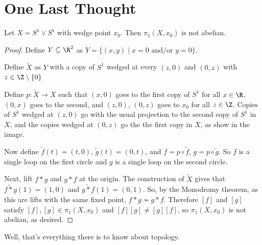 \section{One Last Thought}
\begin{example}
Let $X = S^1 \vee S^1$ with wedge point $x_0$.  Then $\pi_1(X, x_0)$ is not abelian.
\end{example}
\begin{proof}
Define $Y \subseteq \R^2$ as $Y = \{ (x,y) \mid x = 0 \text{ and/or } y = 0\}$.

Define $\widetilde{X}$ as $Y$ with a copy of $S^1$ wedged at every $(z,0)$ and $(0,z)$ with $z \in \Z \setminus \{0\}$

Define $p : \widetilde{X} \to X$ such that $(x,0)$ goes to the first copy of $S^1$ for all $x \in \R$, $(0,x)$ goes to the second, and $(z,0)$, $(0,z)$ goes to $x_0$ for all $z \in \Z$.  Copies of $S^1$ wedged at $(z,0)$ go with the usual projection to the second copy of $S^1$ in $X$, and the copies wedged at $(0,z)$ go the the first copy in $X$, as show in the image.
\placeholder

Now define $\widetilde{f}(t) = (t,0)$, $\widetilde{g}(t) = (0,t)$, and $f = p \circ \widetilde{f}$, $g = p \circ \widetilde{g}$.  So $f$ is a single loop on the first circle and $g$ is a single loop on the second circle.

Next, lift $f * g$ and $g * f$ at the origin.  The construction of $\widetilde{X}$ gives that $\widetilde{f * g}(1) = (1,0)$ and $\widetilde{g * f}(1) = (0,1)$.  So, by the Monodromy theorem, as this are lifts with the same fixed point, $f * g \not \sim g * f$.  Therefore $[f]$ and $[g]$ satisfy $[f],[g] \in \pi_1(X,x_0)$ and $[f][g] \neq [g][f]$, so $\pi_1(X,x_0)$ is not abelian, as desired.

\end{proof}

Well, that's everything there is to know about topology.  


